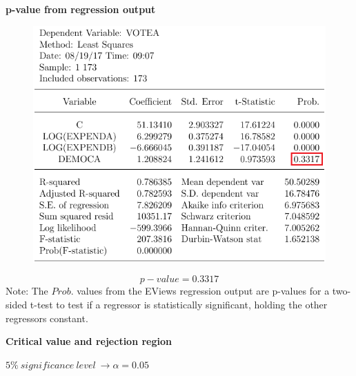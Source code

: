 \documentclass[12pt]{report}
\begin{document}
\newpage
\noindent \textbf{p-value from regression output}
\begin{figure}[H]
	\centering
	\includegraphics{q1_10}
\end{figure}
\vspace{-\baselineskip}
$$p-value = 0.3317$$
\noindent Note: The $Prob.$ values from the EViews regression output are p-values for a two-sided t-test to test if a regressor is statistically significant, holding the other regressors constant.

\noindent \textbf{Critical value and rejection region}

\noindent $5\%\ significance\ level\ \to \alpha = 0.05$
\end{document}
